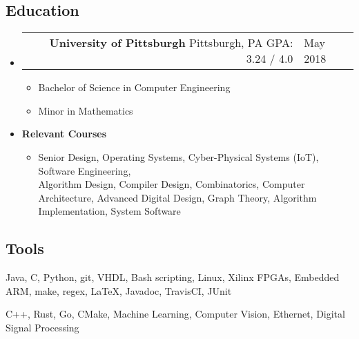 \documentclass[18pt]{article}
\makeatletter
\providecommand{\tightlist}{
    \setlength{\itemsep}{0pt}\setlength{\parskip}{0pt}
}
\providecommand{\datetable}[2]{
    \begin{tabular*}{\textwidth}{@{}r @{\extracolsep{\fill}} l}
        #1 & #2
    \end{tabular*}
}
\makeatother
\begin{document}
    \subsection*{Education}\label{education}
    \begin{itemize}[label={}]

        \item \datetable{
            \textbf{University of Pittsburgh} \textbar{} Pittsburgh, PA \textbar{} GPA: 3.24 / 4.0
        }{May 2018}
        \begin{itemize}[ topsep=0pt]\tightlist
            \item Bachelor of Science in Computer Engineering
            \item Minor in Mathematics
        \end{itemize}
        \item \textbf{Relevant Courses}
            \begin{itemize}[label={}, topsep=0pt]
                \item
                Senior Design,
                Operating Systems,
                Cyber-Physical Systems (IoT),
                Software Engineering,\\
                Algorithm Design,
                Compiler Design,
                Combinatorics,
                Computer Architecture,
                Advanced Digital Design,
                Graph Theory,
                Algorithm Implementation,
                System Software
            \end{itemize}
        \end{itemize}
    
    \subsection*{Tools}\label{languages}
    \begin{description}\tightlist
        \item[Proficient:] Java,
        C,
        Python,
        git,
        VHDL,
        Bash scripting,
        Linux,
        Xilinx FPGAs,
        Embedded ARM,
        make,
        regex,
        \LaTeX,
        Javadoc,
        TravisCI,
        JUnit
        \item[Learning:] C++,
        Rust,
        Go,
        CMake,
        Machine Learning,
        Computer Vision,
        Ethernet,
        Digital Signal Processing
    \end{description}
\end{document}
